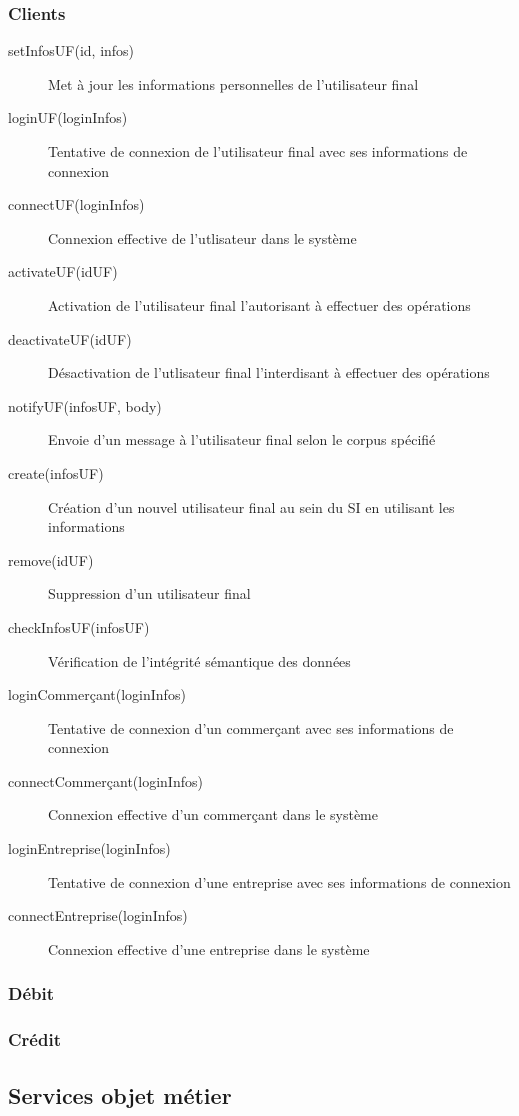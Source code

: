 \subsubsection{Clients}
\begin{description}
  \item[setInfosUF(id, infos)] Met à jour les informations personnelles de l'utilisateur final
  \item[loginUF(loginInfos)] Tentative de connexion de l'utilisateur final avec ses informations de connexion
  \item[connectUF(loginInfos)] Connexion effective de l'utlisateur dans le système
  \item[activateUF(idUF)] Activation de l'utilisateur final l'autorisant à effectuer des opérations
  \item[deactivateUF(idUF)] Désactivation de l'utlisateur final l'interdisant à effectuer des opérations
  \item[notifyUF(infosUF, body)] Envoie d'un message à l'utilisateur final selon le corpus spécifié
  \item[create(infosUF)] Création d'un nouvel utilisateur final au sein du SI en utilisant les informations
  \item[remove(idUF)] Suppression d'un utilisateur final
  \item[checkInfosUF(infosUF)] Vérification de l'intégrité sémantique des données
  \item[loginCommerçant(loginInfos)] Tentative de connexion d'un commerçant avec ses informations de connexion
  \item[connectCommerçant(loginInfos)] Connexion effective d'un commerçant dans le système
  \item[loginEntreprise(loginInfos)] Tentative de connexion d'une entreprise avec ses informations de connexion
  \item[connectEntreprise(loginInfos)] Connexion effective d'une entreprise dans le système
\end{description}

\subsubsection{Débit}
\subsubsection{Crédit}

\subsection{Services objet métier}

